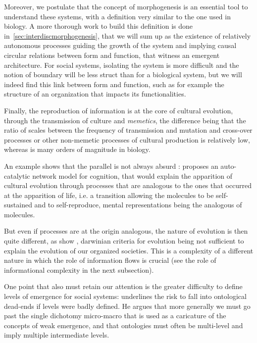 \documentclass[letterpaper]{article}
\begin{document}
Moreover, we postulate that the concept of morphogenesis is an essential tool to understand these systems, with a definition very similar to the one used in biology. A more thorough work to build this definition is done in~\ref{sec:interdiscmorphogenesis}, that we will sum up as the existence of relatively autonomous processes guiding the growth of the system and implying causal circular relations between form and function, that witness an emergent architecture. For social systems, isolating the system is more difficult and the notion of boundary will be less struct than for a biological system, but we will indeed find this link between form and function, such as for example the structure of an organization that impacts its functionalities.

Finally, the reproduction of information is at the core of cultural evolution, through the transmission of culture and \emph{memetics}, the difference being that the ratio of scales between the frequency of transmission and mutation and cross-over processes or other non-memetic processes of cultural production is relatively low, whereas is many orders of magnitude in biology.

An example shows that the parallel is not always absurd : \cite{2017arXiv170305917G} proposes an auto-catalytic network model for cognition, that would explain the apparition of cultural evolution through processes that are analogous to the ones that occurred at the apparition of life, i.e. a transition allowing the molecules to be self-sustained and to self-reproduce, mental representations being the analogous of molecules.

But even if processes are at the origin analogous, the nature of evolution is then quite different, as show \cite{vanderLeeuw2009}, darwinian criteria for evolution being not sufficient to explain the evolution of our organized societies. This is a complexity of a different nature in which the role of information flows is crucial (see the role of informational complexity in the next subsection).

One point that also must retain our attention is the greater difficulty to define levels of emergence for social systems: \cite{roth2009reconstruction} underlines the risk to fall into ontological dead-ends if levels were badly defined. He argues that more generally we must go past the single dichotomy micro-macro that is used as a caricature of the concepts of weak emergence, and that ontologies must often be multi-level and imply multiple intermediate levels.
\end{document}
